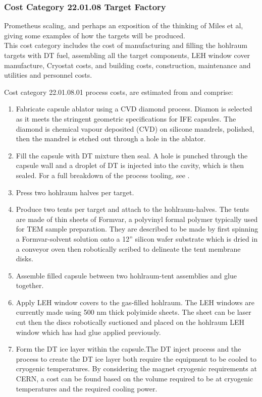 \subsubsection*{Cost Category 22.01.08 Target Factory}

Prometheus scaling, and perhaps an exposition of the thinking of Miles et al, giving some examples of how the targets will be produced.\\

This cost category includes the cost of manufacturing and filling the hohlraum targets with DT fuel, assembling all the target components, LEH window cover manufacture, Cryostat costs, and  building costs, construction, maintenance and utilities and
personnel costs.


Cost category 22.01.08.01 process costs, are estimated from \cite{miles2008life} and comprise:

\begin{enumerate}
    \item Fabricate capsule ablator using a CVD diamond process. Diamon is selected as it meets the stringent geometric specifications for IFE capsules. The diamond is chemical vapour deposited (CVD) on silicone mandrels, polished, then the mandrel is etched out through a hole in the ablator. 
    \item Fill the capsule with DT mixture then seal. A hole is punched through the capsule wall and a droplet of DT is injected into the cavity, which is then sealed. For a full breakdown of the process tooling, see \cite{miles2008life}. 
    \item  Press two hohlraum halves per target.
    \item Produce two tents per target and attach to the hohlraum-halves. The tents are made of thin sheets of Formvar, a polyvinyl formal
polymer typically used for TEM sample preparation. They are described to be made by first spinning a Formvar-solvent solution onto a 12” silicon
wafer substrate which is dried in a conveyor oven then robotically scribed to delineate the tent membrane disks.
    \item Assemble filled capsule between two hohlraum-tent assemblies and
glue together.

    \item Apply LEH window covers to the gas-filled hohlraum. The LEH windows are currently made using 500 nm thick polyimide sheets. The
sheet can be laser cut then the discs robotically suctioned and placed on the
hohlraum LEH window which has had glue applied previously.
    \item Form the DT ice layer within the capsule.The DT inject process and the process to create the DT ice layer both require the equipment to be cooled to cryogenic temperatures. By considering the magnet cryogenic requirements at CERN, a cost can be found based on the volume required to be at cryogenic temperatures and the required cooling power.



\end{enumerate}

